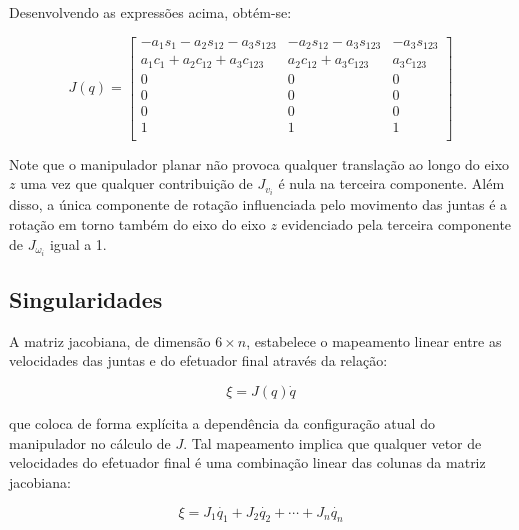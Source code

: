 Desenvolvendo as expressões acima, obtém-se:

\begin{equation}
    J(q) = \begin{bmatrix}
        -a_1 s_1 - a_2 s_{12} - a_3 s_{123} & -a_2 s_{12} - a_3 s_{123} & -a_3 s_{123} \\
        a_1 c_1 + a_2 c_{12} + a_3 c_{123}  & a_2 c_{12} + a_3 c_{123}  & a_3 c_{123}  \\
        0                                   & 0                         & 0            \\
        0                                   & 0                         & 0            \\
        0                                   & 0                         & 0            \\
        1                                   & 1                         & 1            \\
    \end{bmatrix}
\end{equation}

Note que o manipulador planar não provoca qualquer translação ao longo do eixo
\(z\) uma vez que qualquer contribuição de \(J_{v_i}\) é nula na terceira
componente. Além disso, a única componente de rotação influenciada pelo
movimento das juntas é a rotação em torno também do eixo do eixo \(z\)
evidenciado pela terceira componente de \(J_{\omega_i}\) igual a 1.

\subsection{Singularidades}

A matriz jacobiana, de dimensão \(6 \times n\), estabelece o mapeamento linear
entre as velocidades das juntas e do efetuador final através da relação:

\begin{equation}\label{eq:jacobian-mapping}
    \xi = J(q) \dot{q}
\end{equation}

que coloca de forma explícita a dependência da configuração atual do
manipulador no cálculo de \(J\). Tal mapeamento implica que qualquer vetor de
velocidades do efetuador final é uma combinação linear das colunas da matriz
jacobiana:

\begin{equation}
    \xi = J_1 \dot{q_1} + J_2 \dot{q_2} + \cdots + J_n \dot{q_n}
\end{equation}

